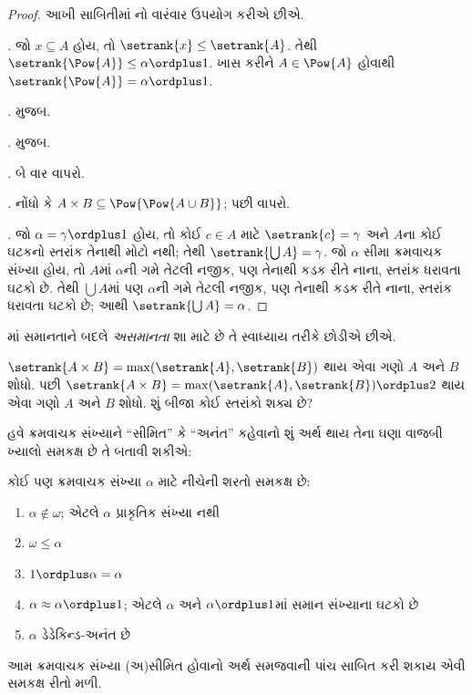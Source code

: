 \begin{proof}
આખી સાબિતીમાં નો
વારંવાર ઉપયોગ કરીએ છીએ.

\emph{.} જો $x \subseteq A$ હોય, તો
$\setrank{x} \leq
\setrank{A}$. તેથી $\setrank{\Pow{A}} \leq \alpha \ordplus  1$.
ખાસ કરીને $A
\in \Pow{A}$ હોવાથી $\setrank{\Pow{A}} = \alpha \ordplus  1$.

\emph{.}  મુજબ.

\emph{.}  મુજબ.

\emph{.}  બે વાર વાપરો.

\emph{.} નોંધો કે
$A \times B \subseteq
\Pow{\Pow{A \cup B}}$; પછી  વાપરો.

\emph{.} જો $\alpha = \gamma\ordplus 1$
હોય, તો કોઈ $c \in A$ માટે $\setrank{c} = \gamma$
અને $A$ના કોઈ ઘટકનો સ્તરાંક તેનાથી મોટો નથી;
તેથી $\setrank{\bigcup A} = \gamma$. જો $\alpha$
સીમા ક્રમવાચક સંખ્યા હોય, તો $A$માં $\alpha$ની
ગમે તેટલી નજીક, પણ તેનાથી કડક રીતે નાના, સ્તરાંક
ધરાવતા ઘટકો છે. તેથી $\bigcup A$માં પણ
$\alpha$ની ગમે તેટલી નજીક, પણ તેનાથી કડક રીતે
નાના, સ્તરાંક ધરાવતા ઘટકો છે; આથી
$\setrank{\bigcup A} = \alpha$.
\end{proof}
\noindent
{}માં સમાનતાને બદલે \emph{અસમાનતા}
શા માટે છે તે સ્વાધ્યાય તરીકે છોડીએ છીએ.

\begin{prob}
$\setrank{A \times B}=
\max(\setrank{A}, \setrank{B})$ થાય એવા ગણો
$A$ અને $B$ શોધો. પછી
$\setrank{A \times B}=\max(\setrank{A}, \setrank{B}) \ordplus  2$
થાય એવા ગણો $A$ અને $B$ શોધો. શું બીજા કોઈ
સ્તરાંકો શક્ય છે?
\end{prob}

હવે ક્રમવાચક સંખ્યાને ``સીમિત'' કે ``અનંત'' કહેવાનો
શું અર્થ થાય તેના ઘણા વાજબી ખ્યાલો સમકક્ષ છે તે
બતાવી શકીએ:

\begin{lem}
કોઈ પણ ક્રમવાચક સંખ્યા $\alpha$ માટે નીચેની શરતો
સમકક્ષ છે:
\begin{enumerate}
	\item{} $\alpha\notin \omega$;
	એટલે $\alpha$ પ્રાકૃતિક સંખ્યા નથી
	\item{} $\omega \leq \alpha$
	\item{} $1 \ordplus  \alpha = \alpha$
	\item{} $\alpha \approx \alpha\ordplus 1$;
	એટલે $\alpha$ અને $\alpha\ordplus 1$માં
	સમાન સંખ્યાના ઘટકો છે
	\item{} $\alpha$ ડેડેકિન્ડ-અનંત છે
	\end{enumerate}
\end{lem}
\noindent
આમ ક્રમવાચક સંખ્યા (અ)સીમિત હોવાનો અર્થ સમજવાની
પાંચ સાબિત કરી શકાય એવી સમકક્ષ રીતો મળી.

